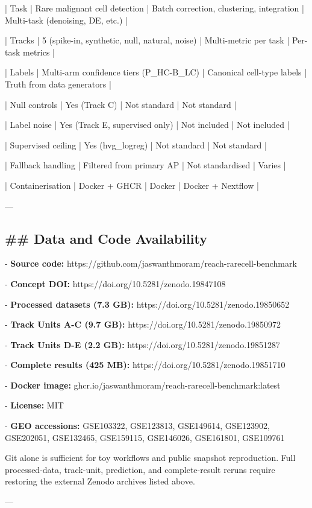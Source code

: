 \documentclass[11pt]{article}
\begin{document}
| Task | Rare malignant cell detection | Batch correction, clustering, integration | Multi-task (denoising, DE, etc.) |

| Tracks | 5 (spike-in, synthetic, null, natural, noise) | Multi-metric per task | Per-task metrics |

| Labels | Multi-arm confidence tiers (P\_HC-B\_LC) | Canonical cell-type labels | Truth from data generators |

| Null controls | Yes (Track C) | Not standard | Not standard |

| Label noise | Yes (Track E, supervised only) | Not included | Not included |

| Supervised ceiling | Yes (hvg\_logreg) | Not standard | Not standard |

| Fallback handling | Filtered from primary AP | Not standardised | Varies |

| Containerisation | Docker + GHCR | Docker | Docker + Nextflow |

---

\subsection*{\#\# Data and Code Availability}
- \textbf{Source code:} https://github.com/jaswanthmoram/reach-rarecell-benchmark

- \textbf{Concept DOI:} https://doi.org/10.5281/zenodo.19847108

- \textbf{Processed datasets (7.3 GB):} https://doi.org/10.5281/zenodo.19850652

- \textbf{Track Units A-C (9.7 GB):} https://doi.org/10.5281/zenodo.19850972

- \textbf{Track Units D-E (2.2 GB):} https://doi.org/10.5281/zenodo.19851287

- \textbf{Complete results (425 MB):} https://doi.org/10.5281/zenodo.19851710

- \textbf{Docker image:} ghcr.io/jaswanthmoram/reach-rarecell-benchmark:latest

- \textbf{License:} MIT

- \textbf{GEO accessions:} GSE103322, GSE123813, GSE149614, GSE123902, GSE202051, GSE132465, GSE159115, GSE146026, GSE161801, GSE109761

Git alone is sufficient for toy workflows and public snapshot reproduction. Full processed-data, track-unit, prediction, and complete-result reruns require restoring the external Zenodo archives listed above.

---
\end{document}

